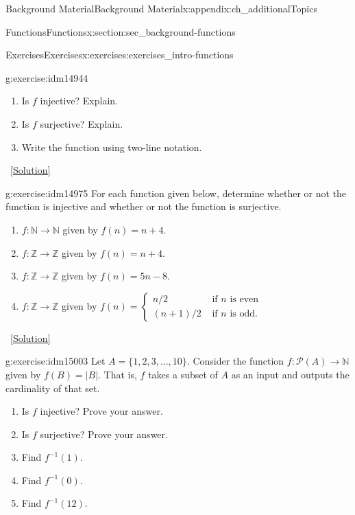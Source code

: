 \documentclass[oneside,10pt,]{book}
\numberwithin{equation}{chapter}
\def\N{\mathbb N}
\def\Z{\mathbb Z}
\def\pow{\mathcal P}
\def\inv{^{-1}}
\newcommand{\amp}{&}
\begin{document}
\begin{appendixptx}{Background Material}{}{Background Material}{}{}{x:appendix:ch_additionalTopics}
\begin{sectionptx}{Functions}{}{Functions}{}{}{x:section:sec_background-functions}
\begin{exercises-subsection}{Exercises}{}{Exercises}{}{}{x:exercises:exercises_intro-functions}
\begin{divisionexercise}{4}{}{}{g:exercise:idm14944}
\begin{sidebyside}{1}{0.3}{0.3}{0}
\begin{sbspanel}{0.4}
{
}%
\end{sbspanel}%
\end{sidebyside}%
\par
%
\begin{enumerate}[label=(\alph*)]
\item{}Is \(f\) injective? Explain.%
\item{}Is \(f\) surjective? Explain.%
\item{}Write the function using two-line notation.%
\end{enumerate}
%
\qquad~\hfill{\tiny\hyperlink{g:solution:idm14961-main}{[Solution]}}\end{divisionexercise}%
\begin{divisionexercise}{5}{}{}{g:exercise:idm14975}%
For each function given below, determine whether or not the function is injective and whether or not the function is surjective.%
\begin{enumerate}[label=(\alph*)]
\item{}\(f:\N \to \N\) given by \(f(n) = n+4\).%
\item{}\(f:\Z \to \Z\) given by \(f(n) = n+4\).%
\item{}\(f:\Z \to \Z\) given by \(f(n) = 5n - 8\).%
\item{}\(f:\Z \to \Z\) given by \(f(n) = \begin{cases}n/2 \amp  \text{ if } n \text{ is even} \\ (n+1)/2 \amp \text{ if } n \text{ is odd} . \end{cases}\)%
\end{enumerate}
%
\qquad~\hfill{\tiny\hyperlink{g:solution:idm14991-main}{[Solution]}}\end{divisionexercise}%
\begin{divisionexercise}{6}{}{}{g:exercise:idm15003}%
Let \(A = \{1,2,3,\ldots,10\}\). Consider the function \(f:\pow(A) \to \N\) given by \(f(B) = |B|\). That is, \(f\) takes a subset of \(A\) as an input and outputs the cardinality of that set.%
\begin{enumerate}[label=(\alph*)]
\item{}Is \(f\) injective? Prove your answer.%
\item{}Is \(f\) surjective? Prove your answer.%
\item{}Find \(f\inv(1)\).%
\item{}Find \(f\inv(0)\).%
\item{}Find \(f\inv(12)\).%

\end{enumerate}
\end{divisionexercise}
\end{exercises-subsection}
\end{sectionptx}
\end{appendixptx}
\end{document}
